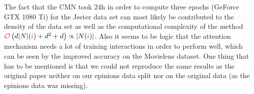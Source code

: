 The fact that the CMN took 24h in order to compute three epochs (GeForce GTX 1080 Ti) for the Jester data set can most likely be contributed to the density of the data set as well as the computational complexity of the method $\bigO\left(d\abs{N}(\idxi)+d^2+d\right)\propto\abs{N(\idxi)}$.
Also it seems to be logic that the attention mechanism needs a lot of training interactions in order to perform well, which can be seen by the improved accuracy on the Movielens dataset.
One thing that has to be mentioned is that we could not reproduce the same results as the original paper neither on our epinions data split nor on the original data (as the epinions data was missing).
